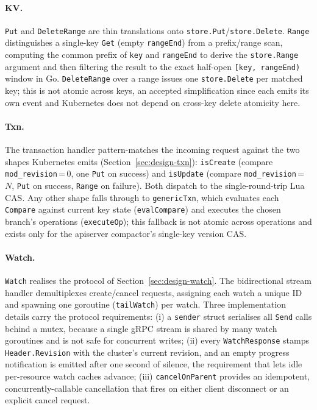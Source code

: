 \paragraph{KV.}
\texttt{Put} and \texttt{DeleteRange} are thin translations onto \texttt{store.Put}/\texttt{store.Delete}. \texttt{Range} distinguishes a single-key \texttt{Get} (empty \texttt{rangeEnd}) from a prefix/range scan, computing the common prefix of \texttt{key} and \texttt{rangeEnd} to derive the \texttt{store.Range} argument and then filtering the result to the exact half-open \texttt{[key, rangeEnd)} window in Go. \texttt{DeleteRange} over a range issues one \texttt{store.Delete} per matched key; this is not atomic across keys, an accepted simplification since each emits its own event and Kubernetes does not depend on cross-key delete atomicity here.

\paragraph{Txn.}
The transaction handler pattern-matches the incoming request against the two shapes Kubernetes emits (Section~\ref{sec:design-txn}): \texttt{isCreate} (compare \texttt{mod\_revision}\,=\,0, one \texttt{Put} on success) and \texttt{isUpdate} (compare \texttt{mod\_revision}\,=\,$N$, \texttt{Put} on success, \texttt{Range} on failure). Both dispatch to the single-round-trip Lua CAS. Any other shape falls through to \texttt{genericTxn}, which evaluates each \texttt{Compare} against current key state (\texttt{evalCompare}) and executes the chosen branch's operations (\texttt{executeOp}); this fallback is not atomic across operations and exists only for the apiserver compactor's single-key version CAS.

\paragraph{Watch.}
\texttt{Watch} realises the protocol of Section~\ref{sec:design-watch}. The bidirectional stream handler demultiplexes create/cancel requests, assigning each watch a unique ID and spawning one goroutine (\texttt{tailWatch}) per watch. Three implementation details carry the protocol requirements: (i) a \texttt{sender} struct serialises all \texttt{Send} calls behind a mutex, because a single gRPC stream is shared by many watch goroutines and is not safe for concurrent writes; (ii) every \texttt{WatchResponse} stamps \texttt{Header.Revision} with the cluster's current revision, and an empty progress notification is emitted after one second of silence, the requirement that lets idle per-resource watch caches advance; (iii) \texttt{cancelOnParent} provides an idempotent, concurrently-callable cancellation that fires on either client disconnect or an explicit cancel request.


